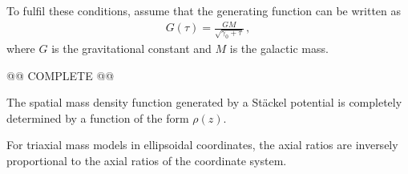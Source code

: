     To fulfil these conditions, assume that the generating function can be written as
    \begin{gather}
        G(\tau) = \frac{GM}{\sqrt{\gamma_0 + \tau}}\,,
    \end{gather}
    where $G$ is the gravitational constant and $M$ is the galactic mass.

    @@ COMPLETE @@

    \begin{theorem}[Kuzmin]
        The spatial mass density function generated by a St\"ackel potential is completely determined by a function of the form $\rho(z)$.
    \end{theorem}
    \begin{result}
        For triaxial mass models in ellipsoidal coordinates, the axial ratios are inversely proportional to the axial ratios of the coordinate system.
    \end{result}